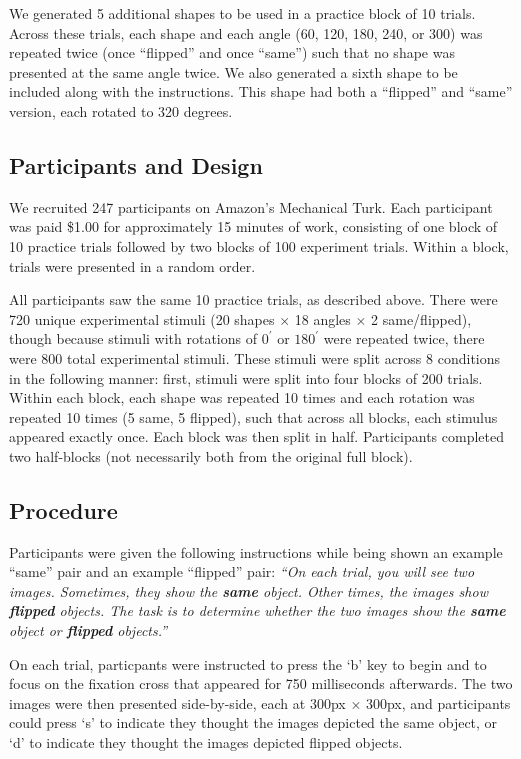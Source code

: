 \documentclass[10pt,letterpaper]{article}
\begin{document}
We generated 5 additional shapes to be used in a practice block of 10
trials. Across these trials, each shape and each angle (60, 120, 180,
240, or 300) was repeated twice (once ``flipped'' and once ``same'')
such that no shape was presented at the same angle twice. We also
generated a sixth shape to be included along with the instructions.
This shape had both a ``flipped'' and ``same'' version, each rotated
to 320 degrees.


\subsection{Participants and Design}

We recruited 247 participants on Amazon's Mechanical Turk. Each
participant was paid \$1.00 for approximately 15 minutes of work,
consisting of one block of 10 practice trials followed by two blocks
of 100 experiment trials. Within a block, trials were presented in a
random order.

All participants saw the same 10 practice trials, as described
above. There were 720 unique experimental stimuli (20 shapes $\times$
18 angles $\times$ 2 same/flipped), though because stimuli with
rotations of $0^\prime$ or $180^\prime$ were repeated twice, there
were 800 total experimental stimuli. These stimuli were split across 8
conditions in the following manner: first, stimuli were split into
four blocks of 200 trials. Within each block, each shape was repeated
10 times and each rotation was repeated 10 times (5 same, 5 flipped),
such that across all blocks, each stimulus appeared exactly once. Each
block was then split in half. Participants completed two half-blocks
(not necessarily both from the original full block).

\subsection{Procedure}

Participants were given the following instructions while being shown
an example ``same'' pair and an example ``flipped'' pair: \textit{``On
  each trial, you will see two images. Sometimes, they show the
  \textbf{same} object. Other times, the images show \textbf{flipped}
  objects. The task is to determine whether the two images show the
  \textbf{same} object or \textbf{flipped} objects.''}

On each trial, particpants were instructed to press the `b' key to
begin and to focus on the fixation cross that appeared for 750
milliseconds afterwards. The two images were then presented
side-by-side, each at 300px $\times$ 300px, and participants could
press `s' to indicate they thought the images depicted the same
object, or `d' to indicate they thought the images depicted flipped
objects.
\end{document}
